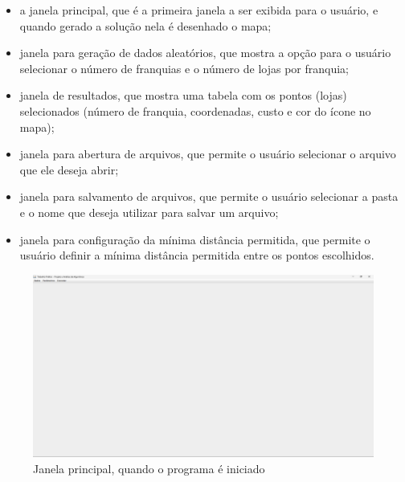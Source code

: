 \documentclass[12pt]{article}
\begin{document}
\begin{itemize}
    \item a janela principal, que é a primeira janela a ser exibida para o usuário, e quando gerado a solução nela é desenhado o mapa;
    \item janela para geração de dados aleatórios, que mostra a opção para o usuário selecionar o número de franquias e o número de lojas por franquia;
    \item janela de resultados, que mostra uma tabela com os pontos (lojas) selecionados (número de franquia, coordenadas, custo e cor do ícone no mapa);
    \item janela para abertura de arquivos, que permite o usuário selecionar o arquivo que ele deseja abrir;
    \item janela para salvamento de arquivos, que permite o usuário selecionar a pasta e o nome que deseja utilizar para salvar um arquivo;
    \item janela para configuração da mínima distância permitida, que permite o usuário definir a mínima distância permitida entre os pontos escolhidos.
\end{itemize}

\begin{figure}[H]
    \centering
    \includegraphics[width=\textwidth]{Captura de tela 2024-06-01 110824}
    \caption{Janela principal, quando o programa é iniciado}
    \label{fig:fig-1}
\end{figure}
\end{document}
